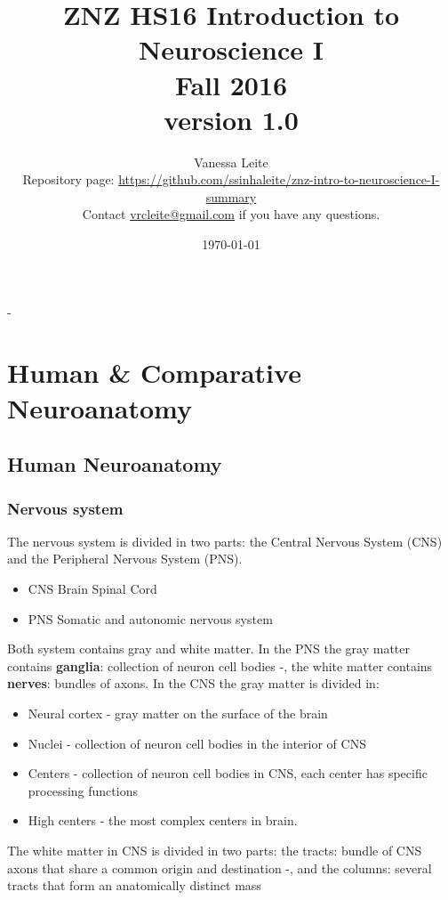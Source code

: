 \documentclass[11pt,article,oneside,a4paper]{memoir}
\title{\textbf{ZNZ HS16 Introduction to Neuroscience I} \\
       Fall 2016\\\normalsize version 1.0}
\author{
	Vanessa Leite
	\vspace{2em}
	\\Repository page: \url{https://github.com/ssinhaleite/znz-intro-to-neuroscience-I-summary}\\
	Contact \href{mailto:vrcleite@gmail.com}{vrcleite@gmail.com} if you have any questions.}
\date{\today}
\begin{document}
\frontmatter


\begin{titlingpage}
  \calccentering{\unitlength}
  \begin{adjustwidth*}{\unitlength-24pt}{-\unitlength-24pt}
    \maketitle
  \end{adjustwidth*}
\end{titlingpage}

\mainmatter



\newpage
\clearpage
{}
\setcounter{tocdepth}{3}
\setcounter{secnumdepth}{2}
\tableofcontents

\clearpage
{}

\newpage

\section{Human \& Comparative Neuroanatomy}
\subsection{Human Neuroanatomy}
\subsubsection{Nervous system}
The nervous system is divided in two parts: the Central Nervous System (CNS) and
the Peripheral Nervous System (PNS).
\begin{itemize}
\item CNS
\subitem Brain
\subitem Spinal Cord
\item PNS
\subitem Somatic and autonomic nervous system
\end{itemize}

Both system contains gray and white matter.
In the PNS the gray matter contains \textbf{ganglia}: collection of neuron cell
bodies -, the white matter contains \textbf{nerves}: bundles of axons.
In the CNS the gray matter is divided in:
\begin{itemize}
\item Neural cortex - gray matter on the surface of the brain
\item Nuclei - collection of neuron cell bodies in the interior of CNS
\item Centers - collection of neuron cell bodies in CNS, each center has specific processing functions
\item High centers - the most complex centers in brain.
\end{itemize}
The white matter in CNS is divided in two parts: the {tracts}: bundle of CNS axons
that share a common origin and destination -, and the {columns}: several tracts
that form an anatomically distinct mass
\end{document}
